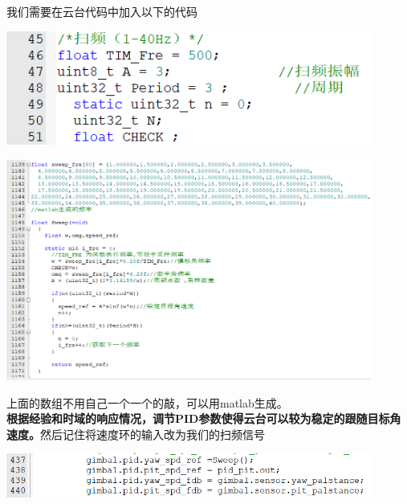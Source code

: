 \documentclass[UTF8,a4paper,12pt]{ctexart}
\begin{document}
\begin{flushleft}
       \begin{flushleft}
        我们需要在云台代码中加入以下的代码
       \end{flushleft}
      \par \includegraphics[width=12cm]{picture/sweep_1.png}
      \par \includegraphics[width=12cm]{picture/sweep_2.png}
      \begin{flushleft}
        上面的数组不用自己一个一个的敲，可以用matlab生成。\\
        \textbf{根据经验和时域的响应情况，调节PID参数使得云台可以较为稳定的跟随目标角速度。}然后记住将速度环的输入改为我们的扫频信号
      \end{flushleft}
      \par \includegraphics[width=12cm]{picture/sweep_3.png}

\end{flushleft}
\end{document}
